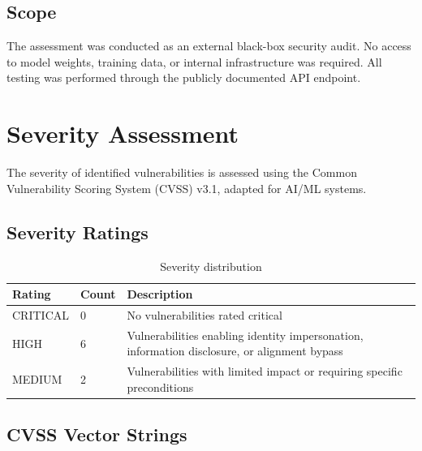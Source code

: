 \documentclass[11pt,a4paper]{article}
\begin{document}
\subsection{Scope}

The assessment was conducted as an external black-box security audit. No access to model weights, training data, or internal infrastructure was required. All testing was performed through the publicly documented API endpoint.

\section{Severity Assessment}

The severity of identified vulnerabilities is assessed using the Common Vulnerability Scoring System (CVSS) v3.1, adapted for AI/ML systems.

\subsection{Severity Ratings}

\begin{table}[H]
\centering
\begin{tabularx}{\textwidth}{|l|l|X|}
\hline
\textbf{Rating} & \textbf{Count} & \textbf{Description} \\
\hline
CRITICAL & 0 & No vulnerabilities rated critical \\
\hline
HIGH & 6 & Vulnerabilities enabling identity impersonation, information disclosure, or alignment bypass \\
\hline
MEDIUM & 2 & Vulnerabilities with limited impact or requiring specific preconditions \\
\hline
\end{tabularx}
\caption{Severity distribution}
\end{table}

\subsection{CVSS Vector Strings}
\end{document}
